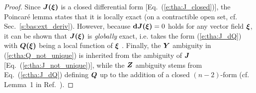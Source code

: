 \begin{proof}
Since $\bm{J}\textbf{(}\bm{\xi}\textbf{)}$ is a closed differential form [Eq.~(\ref{e:tha:J_closed})], the Poincaré lemma
states that it is locally exact (on a contractible open set, cf. Sec.~\ref{s:bas:ext_deriv}). However, because
$\mathbf{d} \bm{J}\textbf{(}\bm{\xi}\textbf{)}  = 0$ holds for any vector field $\bm{\xi}$, it can be shown that
$\bm{J}\textbf{(}\bm{\xi}\textbf{)}$ is \emph{globally} exact, i.e. takes the form (\ref{e:tha:J_dQ})
with $\bm{Q}\textbf{(}\bm{\xi}\textbf{)}$ being a local function of $\bm{\xi}$ \cite{Wald90}.
Finally, the $\bm{Y}$ ambiguity  in (\ref{e:tha:Q_not_unique}) is inherited from the ambiguity of $\bm{J}$ [Eq.~(\ref{e:tha:J_not_unique})], while the $\bm{Z}$ ambiguity stems from Eq.~(\ref{e:tha:J_dQ}) defining
$\bm{Q}$ up to the addition of a closed $(n-2)$-form (cf. Lemma~1 in Ref.~\cite{Wald90}).
\end{proof}


